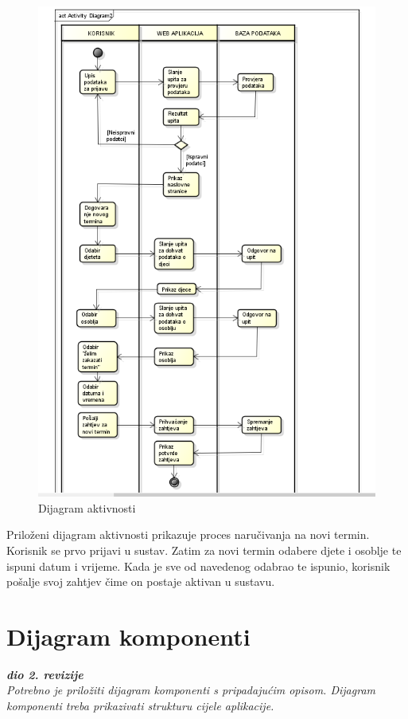 			\begin{figure}[H]
				\includegraphics[scale=1.1]{dijagrami/dijagram_aktivnosti.png}
				\centering
				\caption{Dijagram aktivnosti}
				\label{fig:dijagramAktivnosti}
			\end{figure}
			
			Priloženi dijagram aktivnosti prikazuje proces naručivanja na novi termin. Korisnik se prvo prijavi u sustav. Zatim za novi termin odabere djete i osoblje te ispuni datum i vrijeme. Kada je sve od navedenog odabrao te ispunio, korisnik pošalje svoj zahtjev čime on postaje aktivan u sustavu.
			
			\eject
		\section{Dijagram komponenti}
		
			\textbf{\textit{dio 2. revizije}}\\
		
			 \textit{Potrebno je priložiti dijagram komponenti s pripadajućim opisom. Dijagram komponenti treba prikazivati strukturu cijele aplikacije.}
